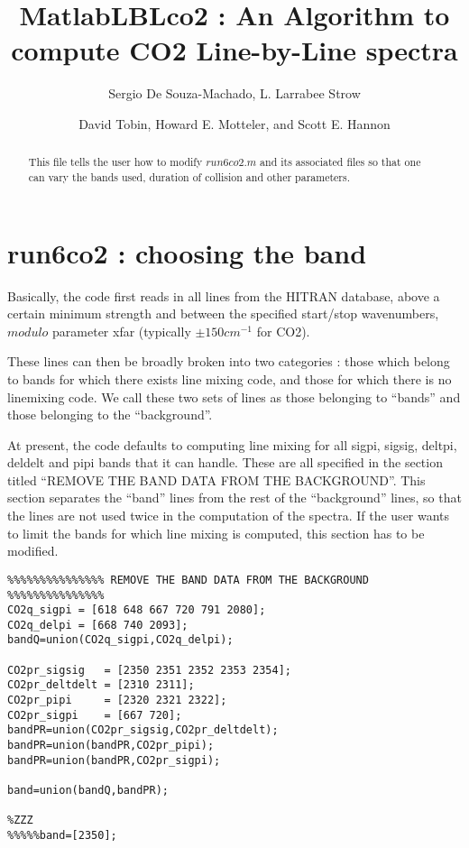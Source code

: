 \documentclass[11pt]{article}
\begin{document}

\title{MatlabLBLco2 : An Algorithm to compute CO2 Line-by-Line spectra}

\author{Sergio De Souza-Machado, L. Larrabee Strow}
\author{David Tobin, Howard E. Motteler, and Scott E. Hannon} 


\begin{abstract}
  This file tells the user how to modify $run6co2.m$ and its associated files 
  so that one can vary the bands used, duration of collision and other
  parameters.

\end{abstract}


\section{run6co2 : choosing the band}
Basically, the code first reads in all lines from the HITRAN database, above
a certain minimum strength and between the specified start/stop wavenumbers, 
$modulo$ parameter xfar (typically $\pm 150 cm^{-1}$ for CO2).

These lines can then be broadly broken into two categories : those which belong
to bands for which there exists line mixing code, and those for which there
is no linemixing code. We call these two sets of lines as those belonging to
``bands'' and those belonging to the ``background''.

At present, the code defaults to computing line mixing for all sigpi, sigsig, 
deltpi, deldelt and pipi bands that it can handle. These are all specified
in the section  titled ``REMOVE THE BAND DATA FROM THE BACKGROUND''. This 
section separates the ``band'' lines from the rest of the ``background'' 
lines, so that the lines are not used twice in the computation of the spectra.
If the user wants to limit the bands for which line mixing is computed,
this section has to be modified.

\begin{verbatim}
%%%%%%%%%%%%%%% REMOVE THE BAND DATA FROM THE BACKGROUND %%%%%%%%%%%%%%% 
CO2q_sigpi = [618 648 667 720 791 2080]; 
CO2q_delpi = [668 740 2093]; 
bandQ=union(CO2q_sigpi,CO2q_delpi); 
 
CO2pr_sigsig   = [2350 2351 2352 2353 2354]; 
CO2pr_deltdelt = [2310 2311]; 
CO2pr_pipi     = [2320 2321 2322]; 
CO2pr_sigpi    = [667 720]; 
bandPR=union(CO2pr_sigsig,CO2pr_deltdelt); 
bandPR=union(bandPR,CO2pr_pipi); 
bandPR=union(bandPR,CO2pr_sigpi); 
 
band=union(bandQ,bandPR); 
 
%ZZZ 
%%%%%band=[2350];  
\end{verbatim}
\end{document}
